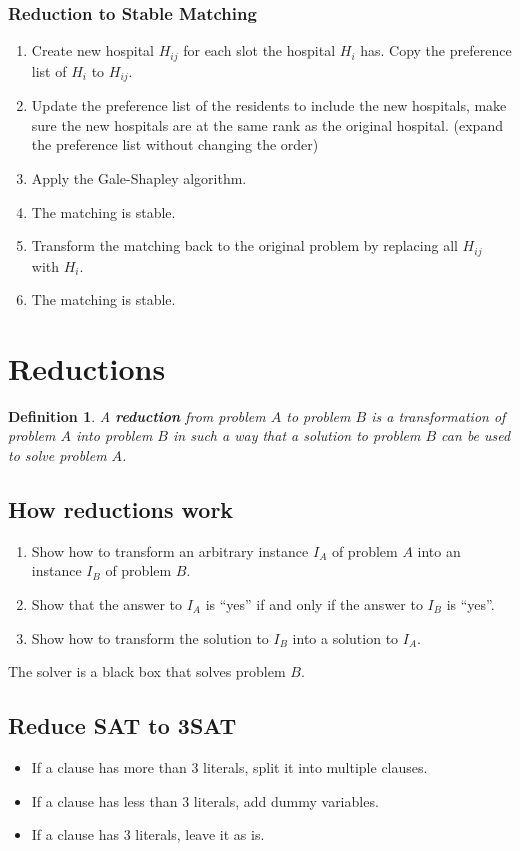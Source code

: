 \documentclass[11pt,fleqn]{article}
\newtheorem*{definition}{Definition}
\begin{document}
\subsubsection{Reduction to Stable Matching}
\begin{enumerate}
    \item Create new hospital $H_{ij}$ for each slot the hospital $H_i$ has. Copy the preference list of $H_i$ to $H_{ij}$.
    \item Update the preference list of the residents to include the new hospitals, make sure the new hospitals are at the same rank as the original hospital. (expand the preference list without changing the order)
    \item Apply the Gale-Shapley algorithm.
    \item The matching is stable.
    \item Transform the matching back to the original problem by replacing all $H_{ij}$ with $H_i$.
    \item The matching is stable.
\end{enumerate}


\section{Reductions}
\begin{definition}
    A \textbf{reduction} from problem $A$ to problem $B$ is a transformation of problem $A$ into problem $B$ in such a way that a solution to problem $B$ can be used to solve problem $A$.
\end{definition}

\subsection{How reductions work}
\begin{enumerate}
    \item Show how to transform an arbitrary instance $I_A$ of problem $A$ into an instance $I_B$ of problem $B$.
    \item Show that the answer to $I_A$ is ``yes'' if and only if the answer to $I_B$ is ``yes''.
    \item Show how to transform the solution to $I_B$ into a solution to $I_A$.
\end{enumerate}
The solver is a black box that solves problem $B$.

\subsection{Reduce SAT to 3SAT}
\begin{itemize}
    \item If a clause has more than 3 literals, split it into multiple clauses.
    \item If a clause has less than 3 literals, add dummy variables.
    \item If a clause has 3 literals, leave it as is.
\end{itemize}
\end{document}
